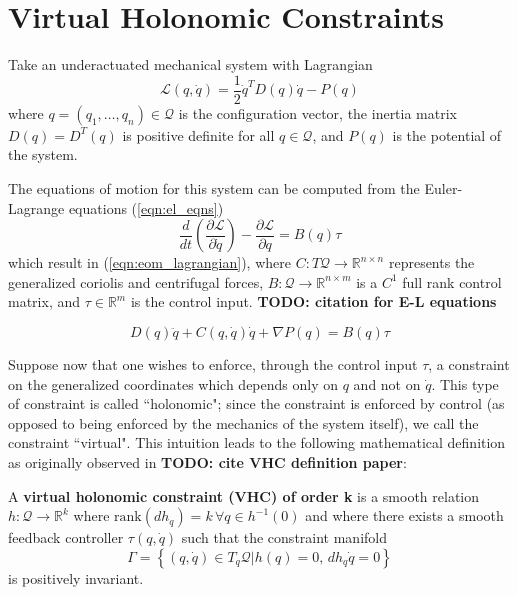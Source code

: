 
\section{Virtual Holonomic Constraints}\label{sec:vhcs}

Take an underactuated mechanical system with Lagrangian
\begin{equation}\label{eqn:lagrangian}
\mathcal{L}(q,\dot{q}) = \frac{1}{2} \dot{q}^T D(q) \dot{q} - P(q)
\end{equation}
where \(q = (q_1,\ldots,q_n) \in \mathcal{Q}\) is the configuration vector, 
the inertia matrix \(D(q) = D^T(q)\) is positive definite for all 
\(q \in \mathcal{Q}\), and \(P(q)\) is the potential of the system.


The equations of motion for this system can be computed from 
the Euler-Lagrange equations (\ref{eqn:el_eqns})
\begin{equation}\label{eqn:el_eqns}
   \frac{d}{dt} \left( \frac{\partial \mathcal{L}}{\partial \dot{q}}\right) -
   \frac{\partial \mathcal{L}}{\partial q} = B(q)\tau
\end{equation}
which result in (\ref{eqn:eom_lagrangian}), where
\(C : T\mathcal{Q} \rightarrow \mathbb{R}^{n \times n}\) represents the
generalized coriolis and centrifugal forces,
\(B : \mathcal{Q} \rightarrow \mathbb{R}^{n \times m}\) is a 
\(C^1\) full rank control matrix, and \(\tau \in \mathbb{R}^{m}\) is the control 
input. \textbf{TODO: citation for E-L equations}

\begin{equation}\label{eqn:eom_lagrangian}
D(q)\ddot{q} + C(q,\dot{q})\dot{q} + \nabla P(q) = B(q)\tau
\end{equation}

Suppose now that one wishes to enforce, through the control input \(\tau\), a
constraint on the generalized coordinates which depends only on \(q\) and not on
\(\dot{q}\). This type of constraint is called ``holonomic"; since the
constraint is enforced by control (as opposed to being enforced by the mechanics
of the system itself), we call the constraint ``virtual". This intuition leads
to the following mathematical definition as originally observed in 
\textbf{TODO: cite VHC definition paper}:

\begin{defn}\label{defn:vhc_order_k}
   A \textbf{virtual holonomic constraint (VHC) of order k} is a smooth relation 
   \( h : \mathcal{Q} \rightarrow \mathbb{R}^k\) where
   \( \text{rank}(dh_q) = k \, \forall q \in h^{-1}(0)\) and where there exists
   a smooth feedback controller \(\tau(q,\dot{q})\) such that the constraint
   manifold
   \[
      \Gamma = \left\{ (q,\dot{q}) \in T_q\mathcal{Q} \vert h(q) = 0, \, 
      dh_q \dot{q} = 0\right\}
   \]
   is positively invariant.
\end{defn}

